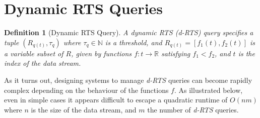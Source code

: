 \documentclass{article}
\newtheorem{definition}{Definition}
\begin{document}
\hspace{95mm}

\section*{Dynamic RTS Queries}

\begin{definition}[Dynamic RTS Query] A dynamic RTS (\textit{d-RTS}) query specifies a tuple $(R_{q(t)}, \tau_q)$ where $\tau_q \in \mathbb{N}$
    is a threshold, and $R_{q(t)} =[f_1(t), f_2(t)]$ is a variable subset of $R$, given by functions $f: t\rightarrow\mathbb{R}$ satisfying $f_1 < f_2$, and $t$ is the index of the data stream.
\end{definition}

As it turns out, designing systems to manage \textit{d-RTS} queries can become rapidly complex depending on the behaviour of the functions $f$. As illustrated below, even in simple cases it appears difficult to escape a quadratic runtime of $O(nm)$ where $n$ is the size of the data stream, and $m$ the number of \textit{d-RTS} queries.
\end{document}
